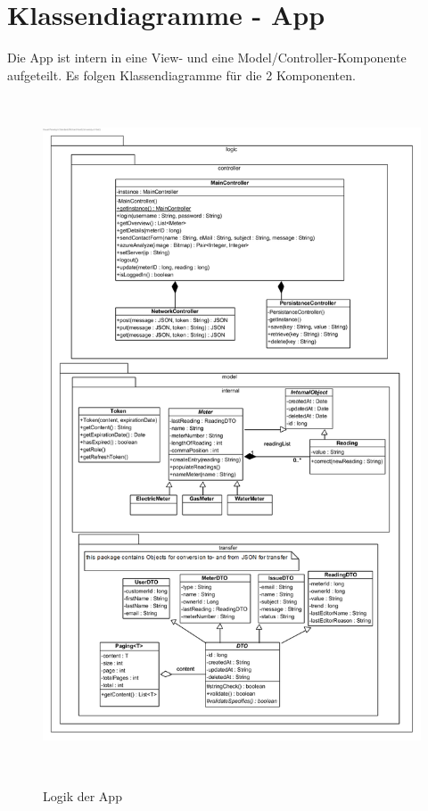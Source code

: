 \section{Klassendiagramme - App}
Die App ist intern in eine View- und eine Model/Controller-Komponente aufgeteilt. Es folgen Klassendiagramme für die 2 Komponenten.
\begin{figure}[H]
\centering
\includegraphics[height=20cm,width=15cm]{img/diagrams/Android-Class-Diagram-Logic}\\
\caption{Logik der App}
\end{figure}


